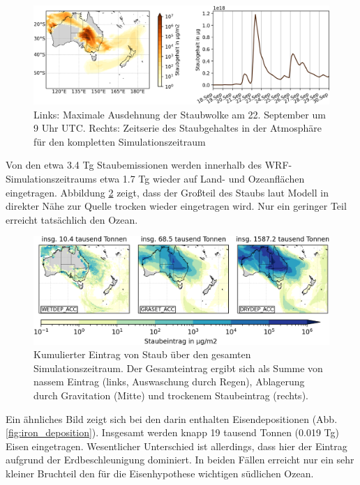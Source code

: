 \documentclass[12pt,a4paper,onecolumn]{scrartcl}
\begin{document}
\begin{figure}
\includegraphics[width=\textwidth]{bilder/dustload_time.png}
\caption{Links: Maximale Ausdehnung der Staubwolke am 22. September um 9 Uhr UTC. Rechts: Zeitserie des Staubgehaltes in der Atmosphäre für den kompletten Simulationszeitraum} \label{fig:dustload_time}
\end{figure}
Von den etwa 3.4 Tg Staubemissionen werden innerhalb des WRF-Simulationszeitraums etwa 1.7 Tg wieder auf Land- und Ozeanflächen eingetragen. Abbildung \ref{fig:deposition} zeigt, dass der Großteil des Staubs laut Modell in direkter Nähe zur Quelle trocken wieder eingetragen wird. Nur ein geringer Teil erreicht tatsächlich den Ozean.
\begin{figure}
\includegraphics[width=\textwidth]{bilder/dust_deposition_vars.png}
\caption{Kumulierter Eintrag von Staub über den gesamten Simulationszeitraum. Der Gesamteintrag ergibt sich als Summe von nassem Eintrag (links, Auswaschung durch Regen), Ablagerung durch Gravitation (Mitte) und trockenem Staubeintrag (rechts).} \label{fig:deposition}
\end{figure}
Ein ähnliches Bild zeigt sich bei den darin enthalten Eisendepositionen (Abb. \ref{fig:iron_deposition}). Insgesamt werden knapp 19 tausend Tonnen (0.019 Tg) Eisen eingetragen. Wesentlicher Unterschied ist allerdings, dass hier der Eintrag aufgrund der Erdbeschleunigung dominiert. In beiden Fällen erreicht nur ein sehr kleiner Bruchteil den für die Eisenhypothese wichtigen südlichen Ozean.
\end{document}
